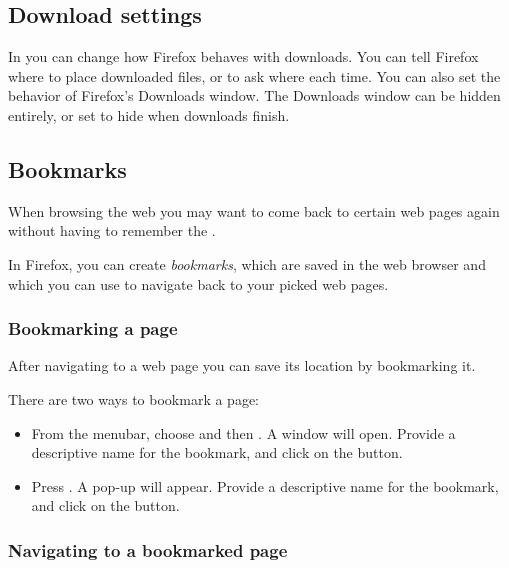 \subsection{Download settings}


In  you can change how Firefox behaves with downloads. You can tell Firefox where to place downloaded files, or to ask where each time. You can also set the behavior of Firefox's Downloads window. The Downloads window can be hidden entirely, or set to hide when downloads finish.

\subsection{Bookmarks}

When browsing the web you may want to come back to certain web pages again
without having to remember the .

In Firefox, you can create \emph{bookmarks}, which are saved in the web 
browser and which you can use to navigate back to your picked web pages.

\subsubsection{Bookmarking a page}

After navigating to a web page you can save its location by bookmarking it.

There are two ways to bookmark a page:

\begin{itemize}
  \item From the menubar, choose  and then 
. A window will open. Provide a descriptive
name for the bookmark, and click on the  button.
  \item Press . A pop-up will appear. Provide a descriptive
name for the bookmark, and click on the  button.
\end{itemize}

\subsubsection{Navigating to a bookmarked page}

